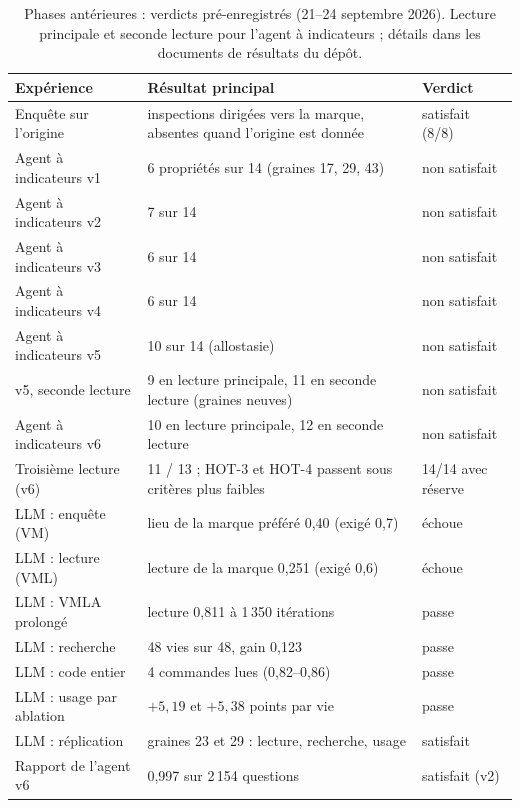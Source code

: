 \documentclass[11pt,a4paper]{article}
\begin{document}
\begin{table}[t]
\centering
\caption{Phases antérieures : verdicts pré-enregistrés (21--24 septembre 2026).
Lecture principale et seconde lecture pour l'agent à indicateurs ; détails dans
les documents de résultats du dépôt.}
\label{tab-prior}
\small
\begin{tabularx}{\textwidth}{@{}l X l@{}}
\toprule
Expérience & Résultat principal & Verdict \\
\midrule
Enquête sur l'origine & inspections dirigées vers la marque, absentes quand l'origine est donnée & satisfait (8/8) \\
Agent à indicateurs v1 & 6 propriétés sur 14 (graines 17, 29, 43) & non satisfait \\
Agent à indicateurs v2 & 7 sur 14 & non satisfait \\
Agent à indicateurs v3 & 6 sur 14 & non satisfait \\
Agent à indicateurs v4 & 6 sur 14 & non satisfait \\
Agent à indicateurs v5 & 10 sur 14 (allostasie) & non satisfait \\
v5, seconde lecture & 9 en lecture principale, 11 en seconde lecture (graines neuves) & non satisfait \\
Agent à indicateurs v6 & 10 en lecture principale, 12 en seconde lecture & non satisfait \\
Troisième lecture (v6) & 11 / 13 ; HOT-3 et HOT-4 passent sous critères plus faibles & 14/14 avec réserve \\
LLM : enquête (VM) & lieu de la marque préféré 0,40 (exigé 0,7) & échoue \\
LLM : lecture (VML) & lecture de la marque 0,251 (exigé 0,6) & échoue \\
LLM : VMLA prolongé & lecture 0,811 à 1\,350 itérations & passe \\
LLM : recherche & 48 vies sur 48, gain 0,123 & passe \\
LLM : code entier & 4 commandes lues (0,82--0,86) & passe \\
LLM : usage par ablation & $+5,19$ et $+5,38$ points par vie & passe \\
LLM : réplication & graines 23 et 29 : lecture, recherche, usage & satisfait \\
Rapport de l'agent v6 & 0,997 sur 2\,154 questions & satisfait (v2) \\
\bottomrule
\end{tabularx}
\end{table}
\end{document}
